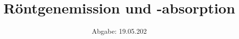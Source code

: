 

\subject{V602}
\title{Röntgenemission und -absorption}
\date{%
  Abgabe: 19.05.202
}



\maketitle
\thispagestyle{empty}
\tableofcontents
\newpage







\printbibliography{}


